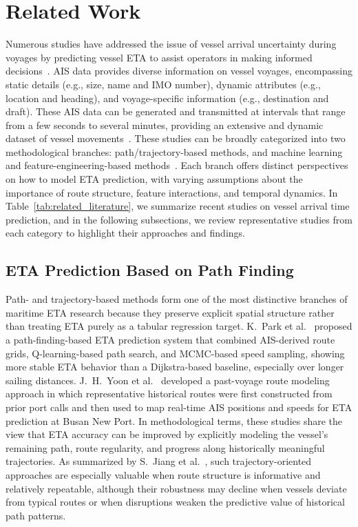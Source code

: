 \documentclass[conference]{IEEEtran}
\begin{document}
\section{Related Work}
Numerous studies have addressed the issue of vessel arrival uncertainty during voyages by predicting vessel ETA to assist operators in making informed decisions~\cite{yuShipArrivalPrediction2018,chuVesselArrivalTime2025,duSegmentedETAPrediction2025,nomanReviewVesselTime2025}. AIS data provides diverse information on vessel voyages, encompassing static details (e.g., size, name and IMO number), dynamic attributes (e.g., location and heading), and voyage-specific information (e.g., destination and draft). These AIS data can be generated and transmitted at intervals that range from a few seconds to several minutes, providing an extensive and dynamic dataset of vessel movements~\cite{yangHarnessingPowerMachine2024, chuEvaluationPredictionPunctuality2023}. These studies can be broadly categorized into two methodological branches: path/trajectory-based methods, and machine learning and feature-engineering-based methods~\cite{leiPredictingVesselArrival2024}. Each branch offers distinct perspectives on how to model ETA prediction, with varying assumptions about the importance of route structure, feature interactions, and temporal dynamics. In Table~\ref{tab:related_literature}, we summarize recent studies on vessel arrival time prediction, and in the following subsections, we review representative studies from each category to highlight their approaches and findings.

\subsection{ETA Prediction Based on Path Finding}
Path- and trajectory-based methods form one of the most distinctive branches of maritime ETA research because they preserve explicit spatial structure rather than treating ETA purely as a tabular regression target. K.~Park et al.~\cite{parkVesselEstimatedTime2021} proposed a path-finding-based ETA prediction system that combined AIS-derived route grids, Q-learning-based path search, and MCMC-based speed sampling, showing more stable ETA behavior than a Dijkstra-based baseline, especially over longer sailing distances. J.~H.~Yoon et al.~\cite{yoonEnhancingContainerVessel2023} developed a past-voyage route modeling approach in which representative historical routes were first constructed from prior port calls and then used to map real-time AIS positions and speeds for ETA prediction at Busan New Port. In methodological terms, these studies share the view that ETA accuracy can be improved by explicitly modeling the vessel's remaining path, route regularity, and progress along historically meaningful trajectories. As summarized by S.~Jiang et al.~\cite{jiangPredictionVesselArrival2025}, such trajectory-oriented approaches are especially valuable when route structure is informative and relatively repeatable, although their robustness may decline when vessels deviate from typical routes or when disruptions weaken the predictive value of historical path patterns.
\end{document}
